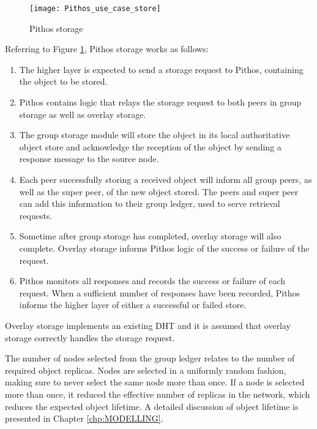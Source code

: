 \begin{figure}[htbp]
 \centering
 \texttt{[image: Pithos\_use\_case\_store]}
 \caption{Pithos storage}
 \label{fig_pithos_storage}
\end{figure}
%
Referring to Figure \ref{fig_pithos_storage}, Pithos storage works as follows:
%
\begin{enumerate}
\item The higher layer is expected to send a storage request to Pithos, containing the object to be stored.

\item Pithos contains logic that relays the storage request to both peers in group storage as well as overlay storage.

\item The group storage module will store the object in its local authoritative object store and acknowledge the reception of the object by sending a response message to the source node.

\item Each peer successfully storing a received object will inform all group peers, as well as the super peer, of the new object stored. The peers and super peer can add this information to their group ledger, used to serve retrieval requests.

\item Sometime after group storage has completed, overlay storage will also complete. Overlay storage informs Pithos logic of the success or failure of the request.

\item Pithos monitors all responses and records the success or failure of each request. When a sufficient number of responses have been recorded, Pithos informs the higher layer of either a successful or failed store.
\end{enumerate}

Overlay storage implements an existing DHT and it is assumed that overlay storage correctly handles the storage request.

The number of nodes selected from the group ledger relates to the number of required object replicas. Nodes are selected in a uniformly random fashion, making sure to never select the same node more than once. If a node is selected more than once, it reduced the effective number of replicas in the network, which reduces the expected object lifetime. A detailed discussion of object lifetime is presented in Chapter \ref{chp:MODELLING}.

